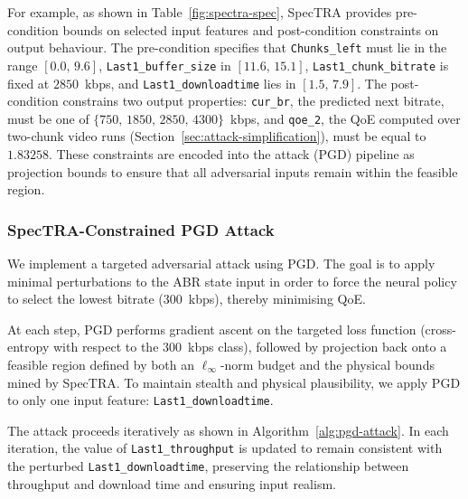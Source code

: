 \documentclass[thesis]{uofithesis} %
\begin{document}
    For example, as shown in Table~\ref{fig:spectra-spec}, SpecTRA
    provides pre-condition bounds on selected input features and
    post-condition constraints on output behaviour.  The pre-condition
    specifies that \texttt{Chunks\_left} must lie in the range $[0.0,\,
    9.6]$, \texttt{Last1\_buffer\_size} in $[11.6,\, 15.1]$,
    \texttt{Last1\_chunk\_bitrate} is fixed at $2850$~kbps, and
    \texttt{Last1\_downloadtime} lies in $[1.5,\, 7.9]$.  The
    post-condition constrains two output properties:
    \texttt{cur\_br}, the predicted next bitrate, must be one of
    $\{750,\, 1850,\, 2850,\, 4300\}$~kbps, and \texttt{qoe\_2}, the
    QoE computed over two-chunk video runs (Section~\ref{sec:attack-simplification}), must be equal to $1.83258$.
    These constraints are encoded into the
    attack (PGD) pipeline as projection bounds to ensure that all adversarial
    inputs remain within the feasible region.
    
    
    \subsubsection{SpecTRA-Constrained PGD Attack}
    \label{sec:attack-pgd}
    
    We implement a targeted adversarial attack using PGD.  The goal is to
    apply minimal perturbations to the ABR state input in order to force
    the neural policy to select the lowest bitrate ($300$~kbps), thereby
    minimising QoE.
    
    At each step, PGD performs gradient ascent on the targeted loss
    function (cross-entropy with respect to the $300$~kbps class), followed
    by projection back onto a feasible region defined by both an
    $\ell_\infty$-norm budget and the physical bounds mined by SpecTRA.
    To maintain stealth and physical plausibility, we apply PGD to only one
    input feature: \texttt{Last1\_downloadtime}.
    
    The attack proceeds iteratively as shown in
    Algorithm~\ref{alg:pgd-attack}.  In each iteration, the value of
    \texttt{Last1\_throughput} is updated to remain consistent with the
    perturbed \texttt{Last1\_downloadtime}, preserving the relationship
    between throughput and download time and ensuring input realism.
    
\end{document}
